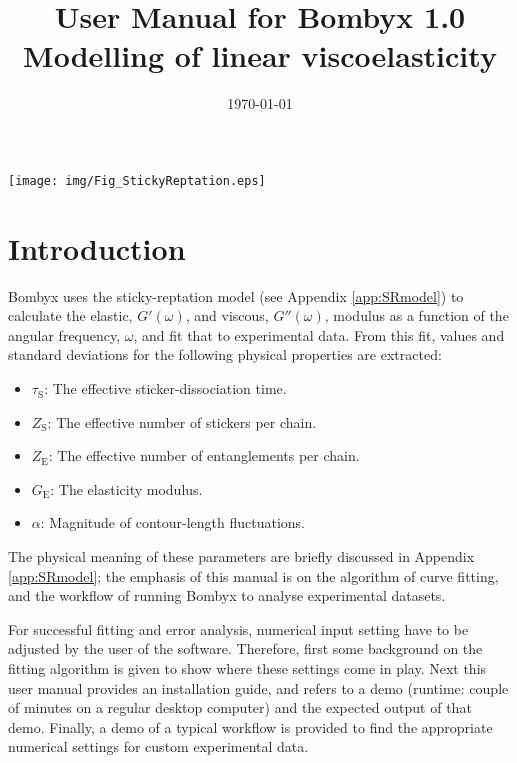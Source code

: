 \documentclass[  superscriptaddress]{revtex4}
\begin{document}
\title[-]
  {\huge{User Manual for Bombyx 1.0}\bigskip\\ \Large{Modelling of linear viscoelasticity}\bigskip\\ \hphantom{0}}


\date{\today}



\maketitle
\vfill 
\begin{center}
\texttt{[image: img/Fig\_StickyReptation.eps]}
\end{center}
\vfill 
\tableofcontents
%
%


\newpage

\section{Introduction}

Bombyx uses the sticky-reptation model (see Appendix \ref{app:SRmodel}) to calculate the elastic, $G'(\omega)$, and viscous, $G''(\omega)$, modulus as a function of the angular frequency, $\omega$, and fit that to experimental data.
From this fit, values and standard deviations for the following physical properties are extracted:
\begin{itemize}
 \item $\tau_\mathrm{S}$: The effective  sticker-dissociation time.
 \item $Z_\mathrm{S}$: The effective number of stickers per chain.
 \item $Z_\mathrm{E}$: The effective number of entanglements per chain.
 \item $G_\mathrm{E}$: The elasticity modulus.
 \item $\alpha$: Magnitude of contour-length fluctuations.
\end{itemize} 
The physical meaning of these parameters are briefly discussed in Appendix \ref{app:SRmodel}; the emphasis of this manual is on the algorithm of curve fitting, and the workflow of running Bombyx to analyse experimental datasets. 

For successful fitting and error analysis, numerical input setting have to be adjusted by the user of the software.
Therefore, first some background on the fitting algorithm is given to show where these settings come in play. Next this user manual provides an installation guide, and refers to a demo (runtime: couple of minutes on a regular desktop computer) and the expected output of that demo.
Finally, a demo of a typical workflow is provided to find the appropriate numerical settings for custom experimental data.
\end{document}
